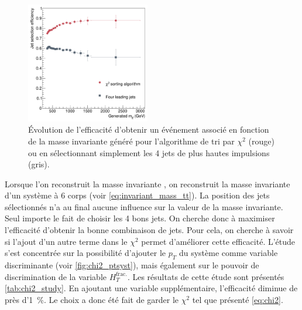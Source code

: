 \begin{figure}[tbp]
  \centering
  \includegraphics[width=0.48\textwidth]{chapitre6/figs/chi2/jet_selection_efficiency.pdf}
  \caption{ Évolution de l'efficacité d'obtenir un événement associé en fonction de la masse invariante \ttbar généré pour l'algorithme de tri par $\chi^2$ (\textcolor{rouge_grandmere}{rouge}) ou en sélectionnant simplement les 4 jets de plus hautes impulsions (\textcolor{bleu_gris}{gris}).}
  \label{fig:chi2_vs_jets}
\end{figure}

Lorsque l'on reconstruit la masse invariante \ttbar, on reconstruit la masse invariante d'un système à 6 corps (voir \cref{eq:invariant_mass_tt}). La position des jets sélectionnés n'a au final aucune influence sur la valeur de la masse invariante. Seul importe le fait de choisir les 4 bons jets. On cherche donc à maximiser l'efficacité d'obtenir la bonne combinaison de jets. Pour cela, on cherche à savoir si l'ajout d'un autre terme dans le $\chi^2$ permet d'améliorer cette efficacité. L'étude s'est concentrée sur la possibilité d'ajouter le $p_T$ du système \ttbar comme variable discriminante (voir  \cref{fig:chi2_ptsyst}), mais également sur le pouvoir de discrimination de la variable $H_{T}^{\text{frac.}}$. Les résultats de cette étude sont présentés \cref{tab:chi2_study}. En ajoutant une variable supplémentaire, l'efficacité diminue de près d'\SI{1}{\%}. Le choix a donc été fait de garder le $\chi^2$ tel que présenté \cref{eq:chi2}.

